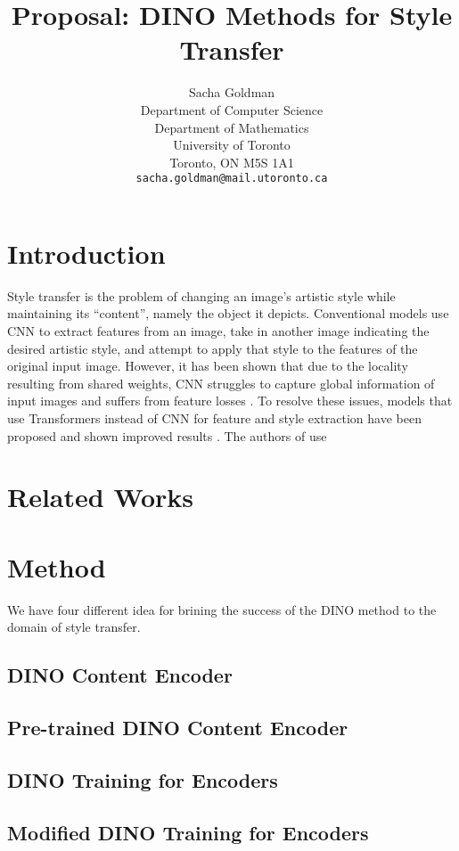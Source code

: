 \documentclass{article}
\title{Proposal: DINO Methods for Style Transfer}
\author{
  Sacha Goldman \\
  Department of Computer Science\\ 
  Department of Mathematics\\
  University of Toronto\\
  Toronto, ON M5S 1A1 \\
  \texttt{sacha.goldman@mail.utoronto.ca} \\
}
\begin{document}
\maketitle

\begin{abstract}

\end{abstract}

\section{Introduction}
Style transfer is the problem of changing an image's artistic style while maintaining its ``content'', namely the object it depicts. Conventional models use CNN to extract features from an image, take in another image indicating the desired artistic style, and attempt to apply that style to the features of the original input image. However, it has been shown that due to the locality resulting from shared weights, CNN struggles to capture global information of input images and suffers from feature losses \cite{ImageStyleTransformer}. To resolve these issues, models that use Transformers instead of CNN for feature and style extraction have been proposed and shown improved results \cite{ImageStyleTransformer}. The authors of \cite{ImageStyleTransformer} use 


\section{Related Works}



\section{Method}

We have four different idea for brining the success of the DINO method to the domain of style transfer.

\subsection{DINO Content Encoder} 

\subsection{Pre-trained DINO Content Encoder}

\subsection{DINO Training for Encoders}

\subsection{Modified DINO Training for Encoders}

\medskip

\nocite{*}


\end{document}
